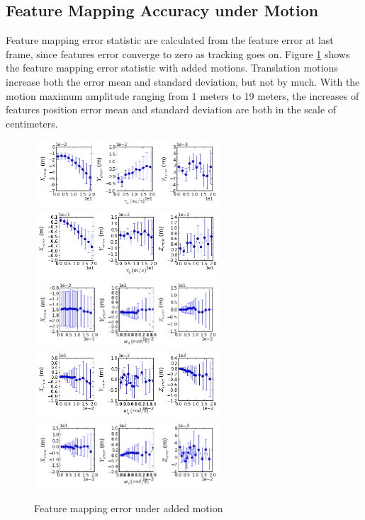 \subsection{Feature Mapping Accuracy under Motion}\label{sec:featureMotion}

Feature mapping error statistic are calculated from the feature error at
last frame, since features error converge to zero as tracking goes on.
Figure \ref{fig:simfig20-24} shows the feature mapping error statistic
with added motions. Translation motions increase both the error mean
and standard deviation, but not by much. With the motion maximum
amplitude ranging from 1 meters to 19 meters, the increases of
features position error mean and standard deviation are both in the
scale of centimeters.

\begin{figure}[h]
  \centering
  \includegraphics[width=7cm, height=2.5cm]{./Figures/SimulationFigures/Figure20.png}
  \includegraphics[width=7cm, height=2.5cm]{./Figures/SimulationFigures/Figure21.png}
  \includegraphics[width=7cm, height=2.5cm]{./Figures/SimulationFigures/Figure22.png}
  \includegraphics[width=7cm, height=2.5cm]{./Figures/SimulationFigures/Figure23.png}
  \includegraphics[width=7cm, height=2.5cm]{./Figures/SimulationFigures/Figure24.png}
  \caption{Feature mapping error under added motion}
  \label{fig:simfig20-24}
\end{figure}

